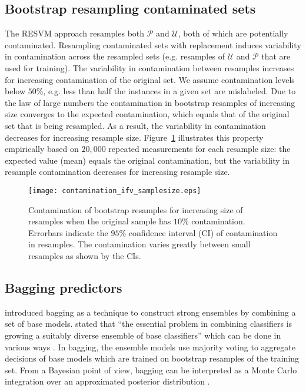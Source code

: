 \documentclass[preprint,elsarticle-num,12pt]{elsarticle}
\begin{document}


\subsection{Bootstrap resampling contaminated sets} \label{resampling}

The RESVM approach resamples both $\mathcal{P}$ and $\mathcal{U}$, both of which are potentially contaminated. Resampling contaminated sets with replacement induces variability in contamination across the resampled sets (e.g. resamples of $\mathcal{U}$ and $\mathcal{P}$ that are used for training). The variability in contamination between resamples increases for increasing contamination of the original set. We assume contamination levels below $50\%$, e.g. less than half the instances in a given set are mislabeled. Due to the law of large numbers the contamination in bootstrap resamples of increasing size converges to the expected contamination, which equals that of the original set that is being resampled. As a result, the variability in contamination decreases for increasing resample size. Figure~\ref{fig:contamination} illustrates this property empirically based on $20,000$ repeated measurements for each resample size: the expected value (mean) equals the original contamination, but the variability in resample contamination decreases for increasing resample size.

\begin{figure}[!h]
  \centering
  \texttt{[image: contamination\_ifv\_samplesize.eps]}
  \caption{Contamination of bootstrap resamples for increasing size of resamples when the original sample has $10\%$ contamination. Errorbars indicate the $95\%$ confidence interval (CI) of contamination in resamples. The contamination varies greatly between small resamples as shown by the CIs. } 
  \label{fig:contamination}
\end{figure}


\subsection{Bagging predictors}
\citet{Breiman:1996:BP:231986.231989} introduced bagging as a technique to construct strong ensembles by combining a set of base models. \citet{breiman2000randomizing} stated that ``the essential problem in combining classifiers is growing a suitably diverse ensemble of base classifiers'' which can be done in various ways \citep{brown2005diversity}. In bagging, the ensemble models use majority voting to aggregate decisions of base models which are trained on bootstrap resamples of the training set. From a Bayesian point of view, bagging can be interpreted as a Monte Carlo integration over an approximated posterior distribution \citep{rao1997out}. 
\end{document}
